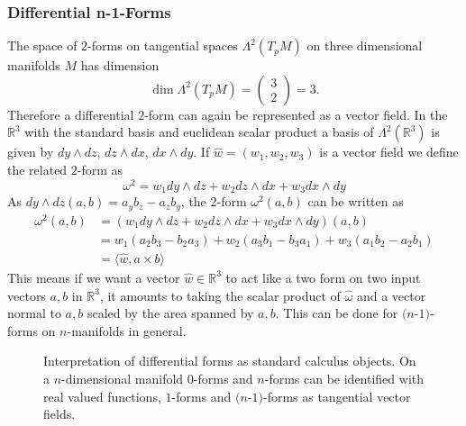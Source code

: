 \subsubsection*{Differential n-1-Forms}
The space of 2-forms on tangential spaces $\Lambda^2(T_pM)$ on three dimensional manifolds $M$ has dimension \[\dim\Lambda^2(T_pM) =\begin{pmatrix}
3\\
2
\end{pmatrix} =3.\] Therefore a differential $2$-form can again be represented as a vector field. In the $\mathbb R^3$ with the standard basis and euclidean scalar product a basis of $\Lambda^2(\mathbb R^3)$ is given by $dy \wedge dz$, $dz \wedge dx$, $dx \wedge dy$. If $\widehat{w} = (w_1,w_2,w_3)$ is a vector field we define the related $2$-form as
\[\omega^2 = w_1 dy \wedge dz + w_2 dz \wedge dx + w_3 dx \wedge dy \]
 As $dy \wedge dz (a,b) = a_yb_z -a_zb_y$,  the 2-form $\omega^2(a,b)$ can be written as
\begin{align*}
\omega^2(a,b) &= (w_1 dy \wedge dz + w_2 dz \wedge dx + w_3 dx \wedge dy)(a,b) \\
&= w_1(a_2b_3 - b_2 a_3) + w_2(a_3b_1-b_3a_1) + w_3(a_1b_2 - a_2b_1) \\
&= \langle \widehat{w}, a \times b \rangle\end{align*} 
This means if we want a vector $\widehat{w} \in \mathbb R^3$ to act like a two form on two input vectors $a,b$ in $\mathbb R^3$, it amounts to taking the scalar product of $\widehat{\omega}$ and a vector normal to $a,b$ scaled by the area spanned by $a,b$. 
This can be done for $(n$-$1)$-forms on $n$-manifolds in general.

\begin{figure}%
\def\svgwidth{\columnwidth}

\caption{Interpretation of differential forms as standard calculus objects. On a $n$-dimensional manifold $0$-forms and $n$-forms can be identified with real valued functions, $1$-forms and $(n$-$1)$-forms as tangential vector fields.}%
\label{fig:4_difformsAre}%
\end{figure}

